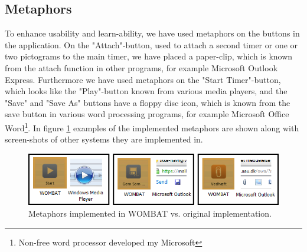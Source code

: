 \subsection{Metaphors}
To enhance usability and learn-ability, we have used metaphors\cite{misc:designInterSys} on the buttons in the application. On the "Attach"-button, used to attach a second timer or one or two pictograms to the main timer, we have placed a paper-clip, which is known from the attach function in other programs, for example Microsoft Outlook Express. Furthermore we have used metaphors on the "Start Timer"-button, which looks like the "Play"-button known from various media players, and the "Save" and "Save As" buttons have a floppy disc icon, which is known from the save button in various word processing programs, for example Microsoft Office Word\footnote{Non-free word processor developed my Microsoft}. In figure \ref{fig:metaphors} examples of the implemented metaphors are shown along with screen-shots of other systems they are implemented in.

\begin{figure}[H]
	\centering
		\includegraphics[width=\textwidth]{Images/Implementation/wombat_metaphors.png}
			\caption{Metaphors implemented in WOMBAT vs. original implementation.}
	\label{fig:metaphors}
\end{figure}